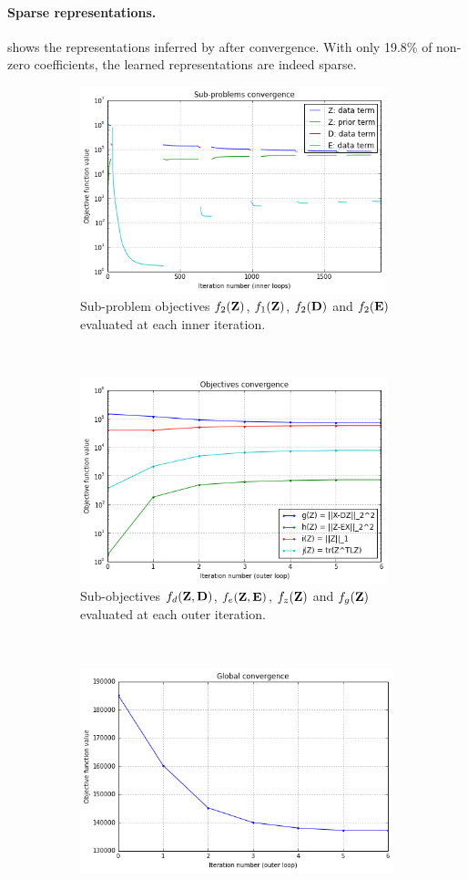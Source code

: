 \paragraph{Sparse representations.}
 shows the representations inferred by  after convergence. With only 19.8\% of non-zero coefficients, the learned representations are indeed sparse.

\begin{figure}[ht]
	\centering
	\begin{subfigure}[b]{0.9\textwidth}
		\centering
		\includegraphics[height=6cm]{img/sub_problems}
		\caption{Sub-problem objectives $f_2(\mathbf{Z})$, $f_1(\mathbf{Z})$, $f_2(\mathbf{D})$ and $f_2(\mathbf{E})$ evaluated at each inner iteration.}
	\end{subfigure}
	\\
	\begin{subfigure}[b]{0.9\textwidth}
		\centering
		\includegraphics[height=6cm]{img/sub_objectives}
		\caption{Sub-objectives $f_d(\mathbf{Z}, \mathbf{D})$, $f_e(\mathbf{Z}, \mathbf{E})$, $f_z(\mathbf{Z})$ and $f_g(\mathbf{Z})$ evaluated at each outer iteration.}
	\end{subfigure}
	\\
	\begin{subfigure}[b]{0.9\textwidth}
		\centering
		\includegraphics[height=6cm]{img/objective}

\end{subfigure}
\end{figure}
